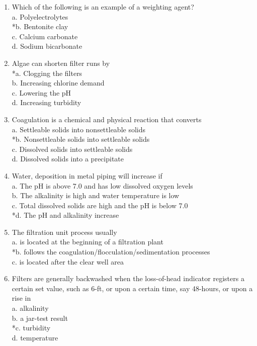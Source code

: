\begin{enumerate}
\item	Which of the following is an example of a weighting agent?\\
a.	Polyelectrolytes\\
*b.	Bentonite clay\\
c.	Calcium carbonate\\
d.	Sodium bicarbonate\\

\item Algae can shorten filter runs by\\
*a.	Clogging the filters\\
b.	Increasing chlorine demand\\
c.	Lowering the pH\\
d.	Increasing turbidity\\

\item Coagulation is a chemical and physical reaction that converts\\
a.	Settleable solids into nonsettleable solids\\
*b.	Nonsettleable solids into settleable solids\\
c.	Dissolved solids into settleable solids\\
d.	Dissolved solids into a precipitate\\

\item Water, deposition in metal piping will increase if\\
a.	The pH is above 7.0 and has low dissolved oxygen levels\\
b.	The alkalinity is high and water temperature is low\\
c.	Total dissolved solids are high and the pH is below 7.0\\
*d.	The pH and alkalinity increase\\

\item The filtration unit process usually\\
a. is located at the beginning of a filtration plant\\
*b. follows the coagulation/flocculation/sedimentation processes\\
c. is located after the clear well area\\

  \item Filters are generally backwashed when the loss-of-head indicator registers a certain set value, such as 6-ft, or upon a certain time, say 48-hours, or upon a rise in\\
a. alkalinity\\
b. a jar-test result\\
*c. turbidity\\
d. temperature\\


\end{enumerate}
